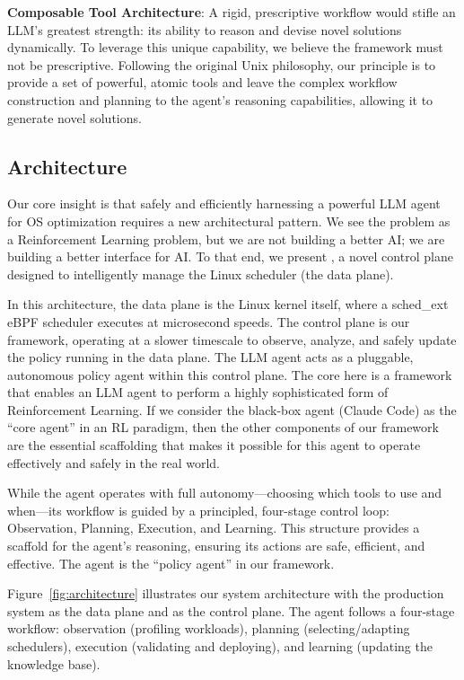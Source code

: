\textbf{Composable Tool Architecture}: A rigid, prescriptive workflow would stifle an LLM's greatest strength: its ability to reason and devise novel solutions dynamically. To leverage this unique capability, we believe the framework must not be prescriptive. Following the original Unix philosophy, our principle is to provide a set of powerful, atomic tools and leave the complex workflow construction and planning to the agent's reasoning capabilities, allowing it to generate novel solutions.

\subsection{\sys  Architecture}

Our core insight is that safely and efficiently harnessing a powerful LLM agent for OS optimization requires a new architectural pattern. We see the problem as a Reinforcement Learning problem, but we are not building a better AI; we are building a better interface for AI. To that end, we present \sys, a novel control plane designed to intelligently manage the Linux scheduler (the data plane).

In this architecture, the data plane is the Linux kernel itself, where a sched\_ext eBPF scheduler executes at microsecond speeds. The control plane is our framework, operating at a slower timescale to observe, analyze, and safely update the policy running in the data plane. The LLM agent acts as a pluggable, autonomous policy agent within this control plane. The core here is a framework that enables an LLM agent to perform a highly sophisticated form of Reinforcement Learning. If we consider the black-box agent (Claude Code) as the ``core agent'' in an RL paradigm, then the other components of our framework are the essential scaffolding that makes it possible for this agent to operate effectively and safely in the real world.

While the agent operates with full autonomy—choosing which tools to use and when—its workflow is guided by a principled, four-stage control loop: Observation, Planning, Execution, and Learning. This structure provides a scaffold for the agent's reasoning, ensuring its actions are safe, efficient, and effective. The agent is the ``policy agent'' in our framework.

Figure~\ref{fig:architecture} illustrates our system architecture with the production system as the data plane and \sys as the control plane. The agent follows a four-stage workflow: observation (profiling workloads), planning (selecting/adapting schedulers), execution (validating and deploying), and learning (updating the knowledge base).

